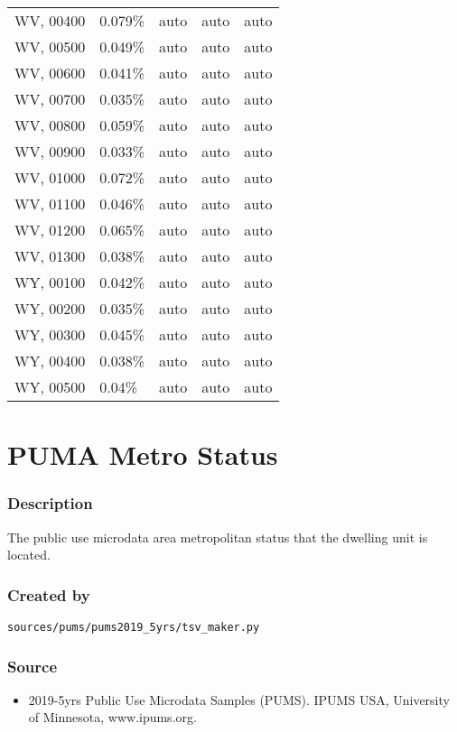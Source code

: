 \begin{longtable}[]{@{}lllll@{}}
WV, 00400 & 0.079\% & auto & auto & auto \\
WV, 00500 & 0.049\% & auto & auto & auto \\
WV, 00600 & 0.041\% & auto & auto & auto \\
WV, 00700 & 0.035\% & auto & auto & auto \\
WV, 00800 & 0.059\% & auto & auto & auto \\
WV, 00900 & 0.033\% & auto & auto & auto \\
WV, 01000 & 0.072\% & auto & auto & auto \\
WV, 01100 & 0.046\% & auto & auto & auto \\
WV, 01200 & 0.065\% & auto & auto & auto \\
WV, 01300 & 0.038\% & auto & auto & auto \\
WY, 00100 & 0.042\% & auto & auto & auto \\
WY, 00200 & 0.035\% & auto & auto & auto \\
WY, 00300 & 0.045\% & auto & auto & auto \\
WY, 00400 & 0.038\% & auto & auto & auto \\
WY, 00500 & 0.04\% & auto & auto & auto \\
\end{longtable}

\section{PUMA Metro Status}\label{puma_metro_status}

\subsubsection{Description}\label{description-126}

The public use microdata area metropolitan status that the dwelling unit
is located.

\subsubsection{Created by}\label{created-by-127}

\texttt{sources/pums/pums2019\_5yrs/tsv\_maker.py}

\subsubsection{Source}\label{source-129}

\begin{itemize}
 
\item
  2019-5yrs Public Use Microdata Samples (PUMS). IPUMS USA, University
  of Minnesota, www.ipums.org.
\end{itemize}


